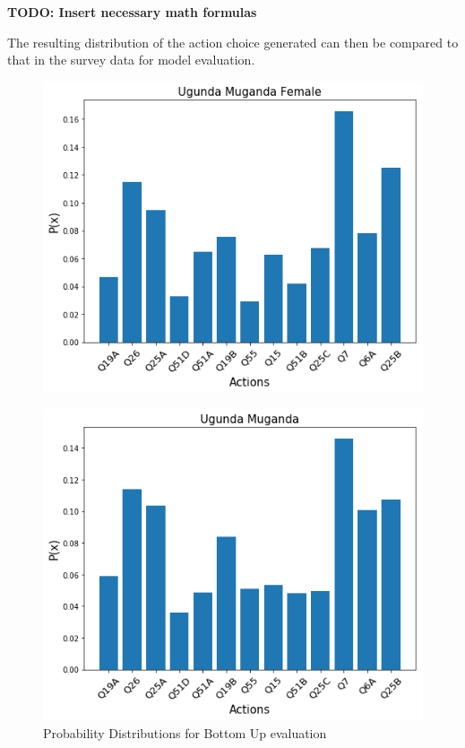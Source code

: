 {\textbf{TODO: Insert necessary math formulas}

The resulting distribution of the action choice generated can then be compared to that in the survey data for model evaluation. 


\begin{figure}[t!]
	\centering 
	
	\caption{Probability Distributions for Bottom Up evaluation}
	\begin{minipage}
		{0.32\textwidth}
		\includegraphics[width=\linewidth]{Images/UgundaMugandaFemaleTopDownHDM.png}
		\label{fig:ugundamugandafemaletopdown}
	\end{minipage}\hfill
	\begin{minipage}{0.32\textwidth}%
		\includegraphics[width=\linewidth]{Images/UgundaMugandaTopDownHDM.png}

\end{minipage}
\end{figure}}
